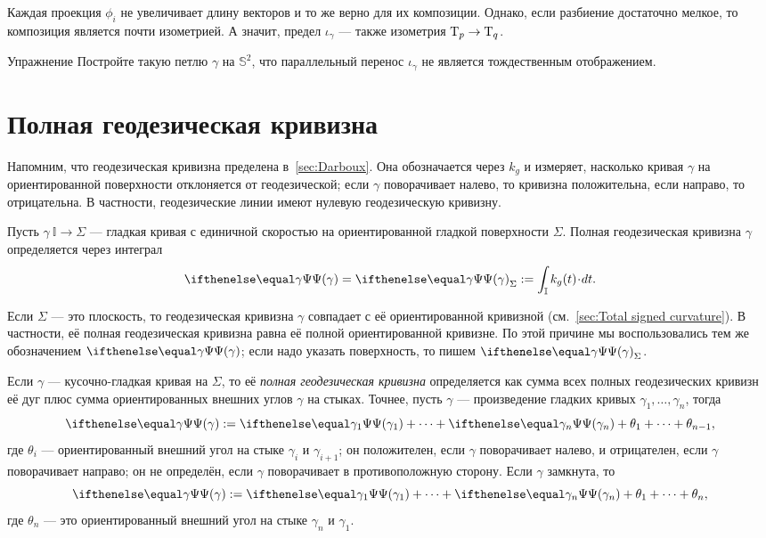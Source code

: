Каждая проекция $\phi_i$ не увеличивает длину векторов и то же верно для их композиции.
Однако, если разбиение достаточно мелкое, то композиция является почти изометрией.
А значит, предел $\iota_\gamma$ --- также изометрия $\T_p\z\to\T_q$.

\begin{thm}{Упражнение}\label{ex:holonomy=not0}
Постройте такую петлю $\gamma$ на $\mathbb{S}^2$, что параллельный перенос $\iota_\gamma$ не является тождественным отображением.
\end{thm}

\section{Полная геодезическая кривизна}

Напомним, что геодезическая кривизна пределена в~\ref{sec:Darboux}.
Она обозначается через $k_g$ и измеряет, насколько кривая $\gamma$ на ориентированной поверхности отклоняется от геодезической;
если $\gamma$ поворачивает налево, то кривизна положительна, если направо, то отрицательна.
В частности, геодезические линии имеют нулевую геодезическую кривизну.

Пусть $\gamma\:\mathbb{I}\to \Sigma$ --- гладкая кривая с единичной скоростью на ориентированной гладкой поверхности $\Sigma$.
Полная геодезическая кривизна $\gamma$ определяется через интеграл 
\[\tgc\gamma=\tgc\gamma_\Sigma
\df
\int_{\mathbb{I}} k_g(t)\cdot dt.\]

Если $\Sigma$ --- это плоскость, то геодезическая кривизна $\gamma$ совпадает
с её ориентированной кривизной (см.~\ref{sec:Total signed curvature}).
В частности, её полная геодезическая кривизна равна её полной ориентированной кривизне.
По этой причине мы воспользовались тем же обозначением $\tgc\gamma$; если надо указать поверхность, то пишем $\tgc\gamma_\Sigma$.

Если $\gamma$ --- кусочно-гладкая кривая на $\Sigma$, то её \emph{полная геодезическая кривизна} определяется как сумма всех полных геодезических кривизн её дуг плюс сумма ориентированных внешних углов $\gamma$ на стыках.
Точнее, пусть $\gamma$ --- произведение гладких кривых $\gamma_1,\dots,\gamma_n$, тогда
\[\tgc\gamma
\df
\tgc{\gamma_1}+\dots+\tgc{\gamma_n}+\theta_1+\dots+\theta_{n-1},\]
где $\theta_i$ --- ориентированный внешний угол на стыке $\gamma_i$ и $\gamma_{i+1}$;
он положителен, если $\gamma$ поворачивает налево, и отрицателен, если $\gamma$ поворачивает направо; он не определён, если $\gamma$ поворачивает в противоположную сторону.
Если $\gamma$ замкнута, то 
\[\tgc\gamma
\df
\tgc{\gamma_1}+\dots+\tgc{\gamma_n}+\theta_1+\dots+\theta_n,\]
где $\theta_n$ --- это ориентированный внешний угол на стыке $\gamma_n$ и $\gamma_1$.

